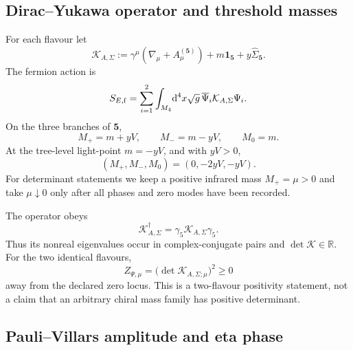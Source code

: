 \documentclass[11pt]{article}
\theoremstyle{definition}
\theoremstyle{remark}
\newcommand{\dd}{\mathrm d}
\newcommand{\RR}{\mathbb R}
\begin{document}
\subsection{Dirac--Yukawa operator and threshold masses}

For each flavour let
\begin{equation}
 \mathcal K_{A,\Sigma}
 :=\gamma^\mu(\nabla_\mu+A_\mu^{(\bm5)})
 +m\bm1_{\bm5}+y\widehat\Sigma_{\bm5}.
 \label{eq:dirac-yukawa}
\end{equation}
The fermion action is
\begin{equation}
 S_{E,{\rm f}}=\sum_{i=1}^2
 \int_{M_4}\!\dd^4x\sqrt g\,\overline\Psi_i\mathcal K_{A,\Sigma}\Psi_i.
 \label{eq:fermion-action}
\end{equation}
On the three branches of \(\bm5\),
\begin{equation}
 M_+=m+yV,
 \qquad M_-=m-yV,
 \qquad M_0=m.
 \label{eq:masses-general}
\end{equation}
At the tree-level light-point \(m=-yV\), and with \(yV>0\),
\begin{equation}
 (M_+,M_-,M_0)=(0,-2yV,-yV).
 \label{eq:masses-tuned}
\end{equation}
For determinant statements we keep a positive infrared mass
\(M_+=\mu>0\) and take \(\mu\downarrow0\) only after all phases and zero
modes have been recorded.

The operator obeys
\begin{equation}
 \mathcal K_{A,\Sigma}^\dagger
 =\gamma_5\mathcal K_{A,\Sigma}\gamma_5.
 \label{eq:gamma5-hermiticity}
\end{equation}
Thus its nonreal eigenvalues occur in complex-conjugate pairs and
\(\det\mathcal K\in\RR\).  For the two identical flavours,
\begin{equation}
 Z_{\Psi,\mu}=\bigl(\det\mathcal K_{A,\Sigma;\mu}\bigr)^2\ge0
 \label{eq:two-flavour-positive}
\end{equation}
away from the declared zero locus.  This is a two-flavour positivity
statement, not a claim that an arbitrary chiral mass family has positive
determinant.

\subsection{Pauli--Villars amplitude and eta phase}
\end{document}
